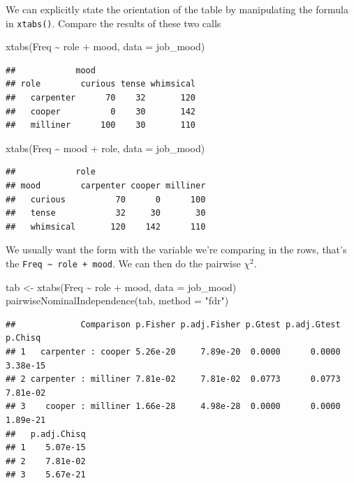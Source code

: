 \documentclass[
]{book}
\newenvironment{Shaded}{\begin{snugshade}}{\end{snugshade}}
\newcommand{\AttributeTok}[1]{\textcolor[rgb]{0.77,0.63,0.00}{#1}}
\newcommand{\FunctionTok}[1]{\textcolor[rgb]{0.00,0.00,0.00}{#1}}
\newcommand{\NormalTok}[1]{#1}
\newcommand{\OtherTok}[1]{\textcolor[rgb]{0.56,0.35,0.01}{#1}}
\newcommand{\SpecialCharTok}[1]{\textcolor[rgb]{0.00,0.00,0.00}{#1}}
\newcommand{\StringTok}[1]{\textcolor[rgb]{0.31,0.60,0.02}{#1}}
\begin{document}
We can explicitly state the orientation of the table by manipulating the formula in \texttt{xtabs()}. Compare the results of these two calls

\begin{Shaded}
\begin{Highlighting}[]
\FunctionTok{xtabs}\NormalTok{(Freq }\SpecialCharTok{\textasciitilde{}}\NormalTok{ role }\SpecialCharTok{+}\NormalTok{ mood, }\AttributeTok{data =}\NormalTok{ job\_mood)}
\end{Highlighting}
\end{Shaded}

\begin{verbatim}
##            mood
## role        curious tense whimsical
##   carpenter      70    32       120
##   cooper          0    30       142
##   milliner      100    30       110
\end{verbatim}

\begin{Shaded}
\begin{Highlighting}[]
\FunctionTok{xtabs}\NormalTok{(Freq }\SpecialCharTok{\textasciitilde{}}\NormalTok{ mood }\SpecialCharTok{+}\NormalTok{ role, }\AttributeTok{data =}\NormalTok{ job\_mood)}
\end{Highlighting}
\end{Shaded}

\begin{verbatim}
##            role
## mood        carpenter cooper milliner
##   curious          70      0      100
##   tense            32     30       30
##   whimsical       120    142      110
\end{verbatim}

We usually want the form with the variable we're comparing in the rows, that's the \texttt{Freq\ \textasciitilde{}\ role\ +\ mood}. We can then do the pairwise \(\chi^2\).

\begin{Shaded}
\begin{Highlighting}[]
\NormalTok{tab }\OtherTok{\textless{}{-}} \FunctionTok{xtabs}\NormalTok{(Freq }\SpecialCharTok{\textasciitilde{}}\NormalTok{ role }\SpecialCharTok{+}\NormalTok{ mood, }\AttributeTok{data =}\NormalTok{ job\_mood)}
\FunctionTok{pairwiseNominalIndependence}\NormalTok{(tab, }\AttributeTok{method =} \StringTok{"fdr"}\NormalTok{)}
\end{Highlighting}
\end{Shaded}

\begin{verbatim}
##             Comparison p.Fisher p.adj.Fisher p.Gtest p.adj.Gtest  p.Chisq
## 1   carpenter : cooper 5.26e-20     7.89e-20  0.0000      0.0000 3.38e-15
## 2 carpenter : milliner 7.81e-02     7.81e-02  0.0773      0.0773 7.81e-02
## 3    cooper : milliner 1.66e-28     4.98e-28  0.0000      0.0000 1.89e-21
##   p.adj.Chisq
## 1    5.07e-15
## 2    7.81e-02
## 3    5.67e-21
\end{verbatim}
\end{document}
